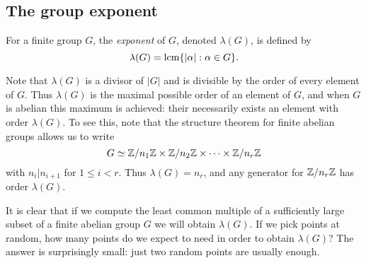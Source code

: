 \subsection{The group exponent}
\begin{df}
For a finite group $G$, the \emph{exponent} of $G$, denoted $\lambda(G)$, is defined by
\[
\lambda(G) = \operatorname{lcm} \{|\alpha|:\alpha\in G\}.
\]
\end{df}
Note that $\lambda(G)$ is a divisor of $|G|$ and is divisible by the order of every element of $G$.
Thus $\lambda(G)$ is the maximal possible order of an element of $G$, and when $G$ is abelian this maximum is achieved: their necessarily exists an element with order $\lambda(G)$.
To see this, note that the structure theorem for finite abelian groups allows us to write 
\[
G\simeq \mathbb{Z}/n_1\mathbb{Z} \times \mathbb{Z}/n_2\mathbb{Z}\times\cdots\times\mathbb{Z}/n_r\mathbb{Z}
\]
with $n_i|n_{i+1}$ for $1\le i < r$.
Thus $\lambda(G)=n_r$, and any generator for $\mathbb{Z}/n_r\mathbb{Z}$ has order $\lambda(G)$.

It is clear that if we compute the least common multiple of a sufficiently large subset of a finite abelian group $G$ we will obtain $\lambda(G)$.
If we pick points at random, how many points do we expect to need in order to obtain $\lambda(G)$?
The answer is surprisingly small: just two random points are usually enough.

